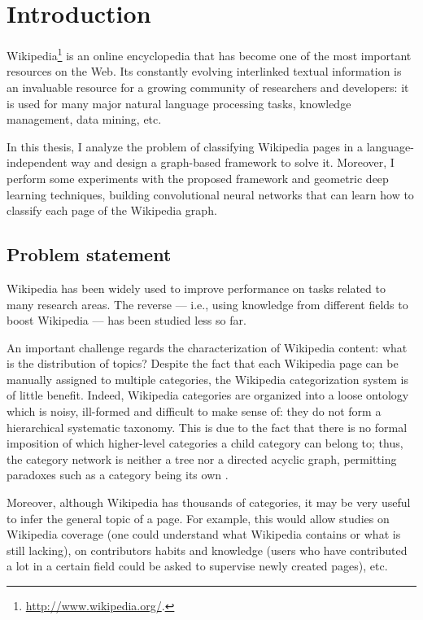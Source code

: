 \chapter{Introduction}
    Wikipedia\footnote{\url{http://www.wikipedia.org/}.} is an online encyclopedia that has become one of the most important resources on the Web. Its constantly evolving interlinked textual information is an invaluable resource for a growing community of researchers and developers: it is used for many major natural language processing tasks, knowledge management, data mining, etc.
    
    In this thesis, I analyze the problem of classifying Wikipedia pages in a language-independent way and design a graph-based framework to solve it. Moreover, I perform some experiments with the proposed framework and geometric deep learning techniques, building convolutional neural networks that can learn how to classify each page of the Wikipedia graph.
    \section{Problem statement}
        Wikipedia has been widely used to improve performance on tasks related to many research areas. The reverse --- i.e., using knowledge from different fields to boost Wikipedia --- has been studied less so far.
        
        An important challenge regards the characterization of Wikipedia content: what is the distribution of topics? Despite the fact that each Wikipedia page can be manually assigned to multiple categories, the Wikipedia categorization system is of little benefit. Indeed, Wikipedia categories are organized into a loose ontology which is noisy, ill-formed and difficult to make sense of: they do not form a hierarchical systematic taxonomy. This is due to the fact that there is no formal imposition of which higher-level categories a child category can belong to; thus, the category network is neither a tree nor a directed acyclic graph, permitting paradoxes such as a category being its own  \cite{Kittur}.
        
        Moreover, although Wikipedia has thousands of categories, it may be very useful to infer the general topic of a page. For example, this would allow studies on Wikipedia coverage (one could understand what Wikipedia contains or what is still lacking), on contributors habits and knowledge (users who have contributed a lot in a certain field could be asked to supervise newly created pages), etc.
        

